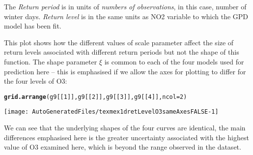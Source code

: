 \documentclass[10pt]{article}\usepackage[]{graphicx}\usepackage[]{color}
\makeatletter
\def\maxwidth{ %
  \ifdim\Gin@nat@width>\linewidth
    \linewidth
  \else
    \Gin@nat@width
  \fi
}
\newcommand{\hlnum}[1]{\textcolor[rgb]{0.686,0.059,0.569}{#1}}%
\newcommand{\hlstd}[1]{\textcolor[rgb]{0.345,0.345,0.345}{#1}}%
\newcommand{\hlkwc}[1]{\textcolor[rgb]{0.333,0.667,0.333}{#1}}%
\newcommand{\hlkwd}[1]{\textcolor[rgb]{0.737,0.353,0.396}{\textbf{#1}}}%
\newenvironment{kframe}{%
 \def\at@end@of@kframe{}%
 \ifinner\ifhmode%
  \def\at@end@of@kframe{\end{minipage}}%
  \begin{minipage}{\columnwidth}%
 \fi\fi%
 \def\FrameCommand##1{\hskip\@totalleftmargin \hskip-\fboxsep
 \colorbox{shadecolor}{##1}\hskip-\fboxsep
     \hskip-\linewidth \hskip-\@totalleftmargin \hskip\columnwidth}%
 \MakeFramed {\advance\hsize-\width
   \@totalleftmargin\z@ \linewidth\hsize
   \@setminipage}}%
 {\par\unskip\endMakeFramed%
 \at@end@of@kframe}
\newenvironment{knitrout}{}{} %
\makeatother
\begin{document}
The {\it Return period} is in units of {\it numbers of observations}, in this case, number of winter days. {\it Return level} is in the same units as NO2 variable to which the GPD model has been fit.

This plot shows how the different values of scale parameter affect the size of return levels associated with different return periods but not the shape of this function.  The shape parameter $\xi$ is common to each of the four models used for prediction here -- this is emphasised if we allow the axes for plotting to differ for the four levels of O3:

\begin{knitrout}
\color{fgcolor}\begin{kframe}
\begin{alltt}
\hlkwd{grid.arrange}\hlstd{(g9[[}\hlnum{1}\hlstd{]],g9[[}\hlnum{2}\hlstd{]],g9[[}\hlnum{3}\hlstd{]],g9[[}\hlnum{4}\hlstd{]],}\hlkwc{ncol}\hlstd{=}\hlnum{2}\hlstd{)}
\end{alltt}
\end{kframe}
\texttt{[image: AutoGeneratedFiles/texmex1dretLevelO3sameAxesFALSE-1]} 

\end{knitrout}

We can see that the underlying shapes of the four curves are identical, the main differences emphasised here is the greater uncertainty associated with the highest value of O3 examined here, which is beyond the range observed in the dataset.
\end{document}
